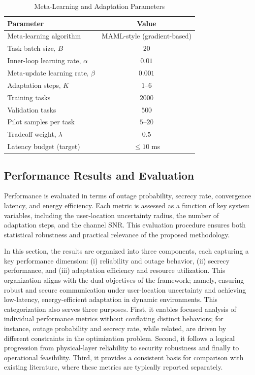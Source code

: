 \documentclass[journal,10pt]{IEEEtran}
\begin{document}
\begin{table}[t]
\centering
\caption{Meta-Learning and Adaptation Parameters}
\label{tab:algo_params}
\begin{tabular}{l c}
\hline
\textbf{Parameter} & \textbf{Value} \\ \hline
Meta-learning algorithm & MAML-style (gradient-based) \\
Task batch size, $B$ & $20$ \\
Inner-loop learning rate, $\alpha$ & $0.01$ \\
Meta-update learning rate, $\beta$ & $0.001$ \\
Adaptation steps, $K$ & $1$--$6$ \\
Training tasks & $2000$ \\
Validation tasks & $500$ \\
Pilot samples per task & $5$--$20$ \\
Tradeoff weight, $\lambda$ & $0.5$ \\
Latency budget (target) & $\leq 10$ ms \\
\hline
\end{tabular}
\end{table}










\subsection{Performance Results and Evaluation}
Performance is evaluated in terms of outage probability, secrecy rate, convergence latency, and energy efficiency. Each metric is assessed as a function of key system variables, including the user-location uncertainty radius, the number of adaptation steps, and the channel SNR. This evaluation procedure ensures both statistical robustness and practical relevance of the proposed methodology.

In this section, the results are organized into three components, each capturing a key performance dimension: (i) reliability and outage behavior, (ii) secrecy performance, and (iii) adaptation efficiency and resource utilization. This organization aligns with the dual objectives of the framework; namely, ensuring robust and secure communication under user-location uncertainty and achieving low-latency, energy-efficient adaptation in dynamic environments.
%
This categorization also serves three purposes. First, it enables focused analysis of individual performance metrics without conflating distinct behaviors; for instance, outage probability and secrecy rate, while related, are driven by different constraints in the optimization problem. Second, it follows a logical progression from physical-layer reliability to security robustness and finally to operational feasibility. Third, it provides a consistent basis for comparison with existing literature, where these metrics are typically reported separately.
\end{document}
